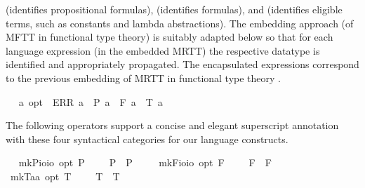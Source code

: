 \begin{isabellebody}
\begin{isamarkuptext}
  (identifies propositional formulas),  (identifies  formulas), and  (identifies 
  eligible terms, such as constants and lambda abstractions). The embedding approach (of MFTT in functional type theory)
  is suitably adapted below so that 
  for each language expression (in the embedded MRTT) the respective datatype 
  is identified and appropriately propagated. The encapsulated expressions  
  correspond to the previous embedding of MRTT in functional type theory  \cite{J23,C40}.%
\end{isamarkuptext}\isamarkuptrue%
\ \isamarkupfalse%
\ {\isacharprime}a\ opt\ {\isacharequal}\ ERR\ {\isacharprime}a\ {\isacharbar}\ P\ {\isacharprime}a\ {\isacharbar}\ F\ {\isacharprime}a\ {\isacharbar}\ T\ {\isacharprime}a%
\begin{isamarkuptext}%
The following operators support a concise and elegant superscript annotation with these
  four syntactical categories for our language constructs.%
\end{isamarkuptext}\isamarkuptrue%
\ \isamarkupfalse%
\ mkP{\isacharcolon}{\isacharcolon}{\isachardoublequoteopen}io{\isasymRightarrow}io\ opt{\isachardoublequoteclose}\ {\isacharparenleft}{\isachardoublequoteopen}{\isacharunderscore}\isactrlsup P{\isachardoublequoteclose}\ {\isacharbrackleft}{}{}{}{\isacharbrackright}\ {}{}{}{\isacharparenright}\ \ \ {\isachardoublequoteopen}{\isasymphi}\isactrlsup P\ {\isasymequiv}\ P\ {\isasymphi}{\isachardoublequoteclose}\ \isanewline
\ \isamarkupfalse%
\ mkF{\isacharcolon}{\isacharcolon}{\isachardoublequoteopen}io{\isasymRightarrow}io\ opt{\isachardoublequoteclose}\ {\isacharparenleft}{\isachardoublequoteopen}{\isacharunderscore}\isactrlsup F{\isachardoublequoteclose}\ {\isacharbrackleft}{}{}{}{\isacharbrackright}\ {}{}{}{\isacharparenright}\ \ \ {\isachardoublequoteopen}{\isasymphi}\isactrlsup F\ {\isasymequiv}\ F\ {\isasymphi}{\isachardoublequoteclose}\ \isanewline
\ \isamarkupfalse%
\ mkT{\isacharcolon}{\isacharcolon}{\isachardoublequoteopen}{\isacharprime}a{\isasymRightarrow}{\isacharprime}a\ opt{\isachardoublequoteclose}\ {\isacharparenleft}{\isachardoublequoteopen}{\isacharunderscore}\isactrlsup T{\isachardoublequoteclose}\ {\isacharbrackleft}{}{}{}{\isacharbrackright}\ {}{}{}{\isacharparenright}\ \ \ {\isachardoublequoteopen}{\isasymphi}\isactrlsup T\ {\isasymequiv}\ T\ {\isasymphi}{\isachardoublequoteclose}\isanewline

\end{isabellebody}
